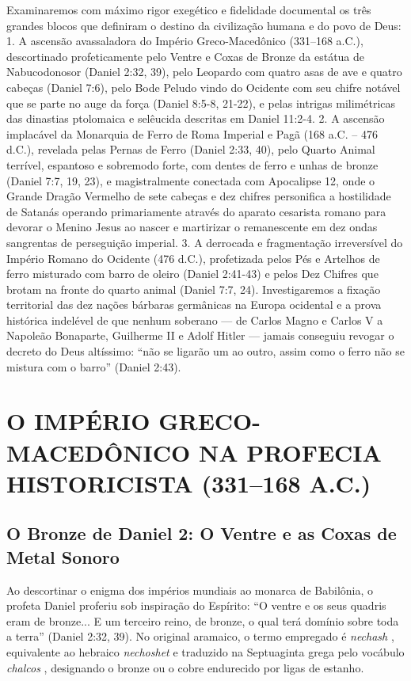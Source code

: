 Examinaremos com máximo rigor exegético e fidelidade documental os três grandes blocos que definiram o destino da civilização humana e do povo de Deus:
1. A ascensão avassaladora do Império Greco-Macedônico (331–168 a.C.), descortinado profeticamente pelo Ventre e Coxas de Bronze da estátua de Nabucodonosor (Daniel 2:32, 39), pelo Leopardo com quatro asas de ave e quatro cabeças (Daniel 7:6), pelo Bode Peludo vindo do Ocidente com seu chifre notável que se parte no auge da força (Daniel 8:5-8, 21-22), e pelas intrigas milimétricas das dinastias ptolomaica e selêucida descritas em Daniel 11:2-4.
2. A ascensão implacável da Monarquia de Ferro de Roma Imperial e Pagã (168 a.C. – 476 d.C.), revelada pelas Pernas de Ferro (Daniel 2:33, 40), pelo Quarto Animal terrível, espantoso e sobremodo forte, com dentes de ferro e unhas de bronze (Daniel 7:7, 19, 23), e magistralmente conectada com Apocalipse 12, onde o Grande Dragão Vermelho de sete cabeças e dez chifres personifica a hostilidade de Satanás operando primariamente através do aparato cesarista romano para devorar o Menino Jesus ao nascer e martirizar o remanescente em dez ondas sangrentas de perseguição imperial.
3. A derrocada e fragmentação irreversível do Império Romano do Ocidente (476 d.C.), profetizada pelos Pés e Artelhos de ferro misturado com barro de oleiro (Daniel 2:41-43) e pelos Dez Chifres que brotam na fronte do quarto animal (Daniel 7:7, 24). Investigaremos a fixação territorial das dez nações bárbaras germânicas na Europa ocidental e a prova histórica indelével de que nenhum soberano — de Carlos Magno e Carlos V a Napoleão Bonaparte, Guilherme II e Adolf Hitler — jamais conseguiu revogar o decreto do Deus altíssimo: ``não se ligarão um ao outro, assim como o ferro não se mistura com o barro'' (Daniel 2:43).



\section{O IMPÉRIO GRECO-MACEDÔNICO NA PROFECIA HISTORICISTA (331–168 A.C.)}



\subsection{O Bronze de Daniel 2: O Ventre e as Coxas de Metal Sonoro}


Ao descortinar o enigma dos impérios mundiais ao monarca de Babilônia, o profeta Daniel proferiu sob inspiração do Espírito: ``O ventre e os seus quadris eram de bronze... E um terceiro reino, de bronze, o qual terá domínio sobre toda a terra'' (Daniel 2:32, 39). No original aramaico, o termo empregado é \textit{nechash} , equivalente ao hebraico \textit{nechoshet} e traduzido na Septuaginta grega pelo vocábulo \textit{chalcos} , designando o bronze ou o cobre endurecido por ligas de estanho.

